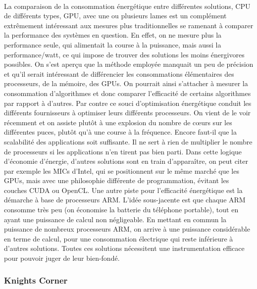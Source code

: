 \documentclass[11pt]{article}
\begin{document}
				\paragraph{}
				La comparaison de la consommation énergétique entre différentes solutions, CPU de différents types, GPU, avec 
				une ou plusieurs lames est un complément extrêmement intéressant aux mesures plus traditionnelles se ramenant 
				à comparer la performance des systèmes en question.
				En effet, on ne mesure plus la performance seule, qui alimentait la course à la puissance, mais aussi la 
				performance/watt, ce qui impose de trouver des solutions les moins énergivores possibles.
				On s'est aperçu que la méthode employée manquait un peu de précision et qu'il serait intéressant de 
				différencier les consommations élémentaires des processeurs, de la mémoire, des GPUs. 
				On pourrait ainsi s'attacher à mesurer la consommation d'algorithmes et donc comparer l'efficacité de 
				certains algorithmes par rapport à d'autres. \newline
				Par contre ce souci d'optimisation énergétique conduit les différents fournisseurs à optimiser leurs 
				différents processeurs. On vient de le voir récemment et on assiste plutôt à une explosion du nombre de cœurs 
				sur les différentes puces, plutôt qu'à une course à la fréquence.
				Encore faut-il que la scalabilité des applications soit suffisante. Il ne sert à rien de multiplier le nombre 
				de processeurs si les applications n'en tirent pas bien parti. \newline
				Dans cette logique d'économie d'énergie, d'autres solutions sont en train d'apparaître, on peut citer par 
				exemple les MICs d'Intel, qui se positionnent sur le même marché que les GPUs, mais avec une philosophie 
				différente de programmation, évitant les couches CUDA ou OpenCL. \newline
				Une autre piste pour l'efficacité énergétique est la démarche à base de processeurs ARM. L'idée sous-jacente est 
				que chaque ARM consomme très peu (on économise la batterie du téléphone portable), tout en ayant une puissance 
				de calcul non négligeable. En mettant en commun la puissance de nombreux processeurs ARM, on arrive à une 
				puissance considérable en terme de calcul, pour une consommation électrique qui reste inférieure à d'autres 
				solutions. \newline
				Toutes ces solutions nécessitent une instrumentation efficace pour pouvoir juger de leur bien-fondé.
			\subsubsection{Knights Corner}
\end{document}
